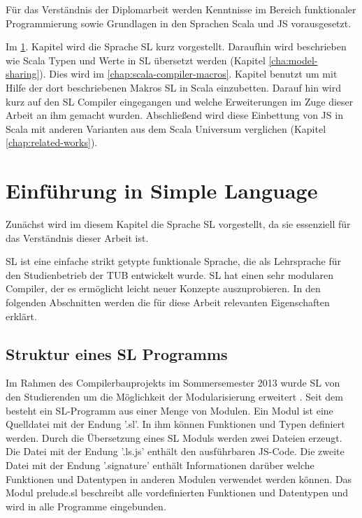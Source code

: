 \documentclass[12pt,bibtotoc]{scrreprt}
\begin{document}
Für das Verständnis der Diplomarbeit werden Kenntnisse im Bereich funktionaler Programmierung sowie Grundlagen in den Sprachen Scala und JS vorausgesetzt.

Im \ref{cha:sl-introduction}. Kapitel wird die Sprache SL kurz vorgestellt. Daraufhin wird beschrieben wie Scala Typen und Werte in SL übersetzt werden (Kapitel \ref{cha:model-sharing}). Dies wird im \ref{chap:scala-compiler-macros}. Kapitel benutzt um mit Hilfe der dort beschriebenen Makros SL in Scala einzubetten. Darauf hin wird kurz auf den SL Compiler eingegangen und welche Erweiterungen im Zuge dieser Arbeit an ihm gemacht wurden. Abschließend wird diese Einbettung von JS in Scala mit anderen Varianten aus dem Scala Universum verglichen (Kapitel \ref{chap:related-works}). 

\chapter{Einführung in Simple Language}
\label{cha:sl-introduction}

Zunächst wird im diesem Kapitel die Sprache SL vorgestellt, da sie essenziell für das Verständnis dieser Arbeit ist.

SL ist eine einfache strikt getypte funktionale Sprache, die als Lehrsprache für den Studienbetrieb der \ac{TUB} entwickelt wurde. SL hat einen sehr modularen Compiler, der es ermöglicht leicht neuer Konzepte auszuprobieren. In den folgenden Abschnitten werden die für diese Arbeit relevanten Eigenschaften erklärt.

\section{Struktur eines SL Programms}

Im Rahmen des Compilerbauprojekts im Sommersemester 2013 wurde SL von den Studierenden um die Möglichkeit der Modularisierung erweitert \cite{Bisping2013}. Seit dem besteht ein SL-Programm aus einer Menge von Modulen. Ein Modul ist eine Quelldatei mit der Endung '.sl'. In ihm können Funktionen und Typen definiert werden. Durch die Übersetzung eines SL Moduls werden zwei Dateien erzeugt. Die Datei mit der Endung '.ls.js' enthält den ausführbaren JS-Code. Die zweite Datei mit der Endung '.signature' enthält Informationen darüber welche Funktionen und Datentypen in anderen Modulen verwendet werden können. Das Modul prelude.sl beschreibt alle vordefinierten Funktionen und Datentypen und wird in alle Programme eingebunden. 
\end{document}

